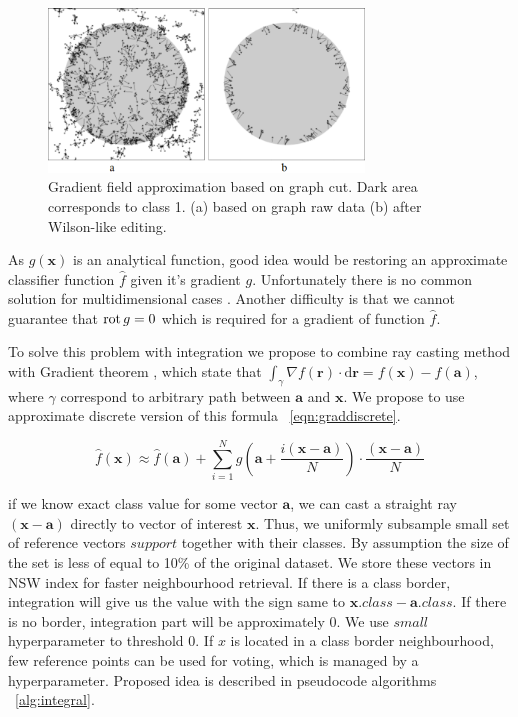 \begin{figure}
    \includegraphics[width=3.3in]{paper/images/01_grad_field.png}
    \caption{Gradient field approximation based on graph cut. Dark area corresponds to class 1. (a) based on graph raw data (b) after Wilson-like editing.}
    \label{fig:gradfield}
\end{figure}

As $g(\mathbf{x})$ is an analytical function, good idea would be restoring an approximate classifier function $\hat{f}$  given it's gradient $g$. Unfortunately there is no common solution for multidimensional cases \cite{fieldbygrad}. Another difficulty is that we cannot guarantee that $\operatorname{rot} g=0$ which is required for a gradient of function $\hat{f}$.

To solve this problem with integration we propose to combine ray casting method with Gradient theorem \cite{gradth}, which state that ${\displaystyle \int_{\gamma}\nabla f (\mathbf {r} )\cdot \mathrm {d} \mathbf {r} =f\left(\mathbf {x} \right)-f \left(\mathbf {a} \right)}$, where $\gamma$ correspond to arbitrary path between $\mathbf{a}$ and $\mathbf{x}$. We propose to use approximate discrete version of this formula ~\ref{eqn:graddiscrete}.

\begin{equation}
\label{eqn:graddiscrete}
\hat{f}(\mathbf{x}) \approx \hat{f}(\mathbf{a}) + \sum_{i=1}^{N}g\left(\mathbf{a}+\frac{i(\mathbf{x}-\mathbf{a})}{N}\right) \cdot \frac{(\mathbf{x}-\mathbf{a})}{N}
\end{equation}

if we know exact class value for some vector $\mathbf{a}$, we can cast a straight ray $(\mathbf{x}-\mathbf{a})$ directly to vector of interest $\mathbf{x}$. Thus, we uniformly subsample small set of reference vectors $support$ together with their classes. By assumption the size of the set is less of equal to 10\% of the original dataset. We store these vectors in NSW index for faster neighbourhood retrieval. If there is a class border, integration will give us the value with the sign same to $\mathbf{x}.class - \mathbf{a}.class$. If there is no border, integration part will be approximately $0$. We use $small$ hyperparameter to threshold $0$. If $x$ is located in a class border neighbourhood, few reference points can be used for voting, which is managed by a hyperparameter. Proposed idea is described in pseudocode algorithms ~\ref{alg:integral}.

